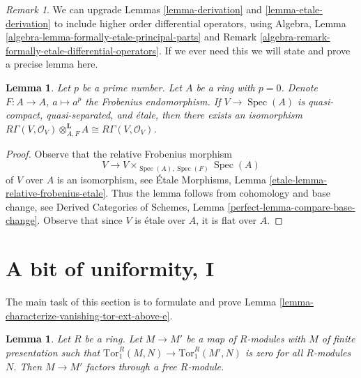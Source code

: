 \documentclass{stacks-project}
\theoremstyle{plain}
\newtheorem{lemma}[subsection]{Lemma}
\theoremstyle{definition}
\theoremstyle{remark}
\newtheorem{remark}[subsection]{Remark}
\numberwithin{equation}{subsection}
\def\Spec{\mathop{\mathrm{Spec}}}
\begin{document}
\begin{remark}
\label{remark-higher-order-operators}
We can upgrade Lemmas \ref{lemma-derivation} and \ref{lemma-etale-derivation}
to include higher order differential operators, using
Algebra, Lemma \ref{algebra-lemma-formally-etale-principal-parts} and
Remark \ref{algebra-remark-formally-etale-differential-operators}.
If we ever need this we will state and prove a
precise lemma here.
\end{remark}

\begin{lemma}
\label{lemma-etale-frobenius}
Let $p$ be a prime number. Let $A$ be a ring with $p = 0$.
Denote $F : A \to A$, $a \mapsto a^p$ the Frobenius endomorphism.
If $V \to \Spec(A)$ is quasi-compact, quasi-separated,
and \'etale, then there exists an isomorphism
$R\Gamma(V, \mathcal{O}_V) \otimes_{A, F}^\mathbf{L} A \cong
R\Gamma(V, \mathcal{O}_V)$.
\end{lemma}

\begin{proof}
Observe that the relative Frobenius morphism
$$
V \longrightarrow V \times_{\Spec(A), \Spec(F)} \Spec(A)
$$
of $V$ over $A$ is an isomorphism, see
\'Etale Morphisms, Lemma \ref{etale-lemma-relative-frobenius-etale}.
Thus the lemma follows from cohomology and base change, see
Derived Categories of Schemes, Lemma
\ref{perfect-lemma-compare-base-change}.
Observe that since $V$ is \'etale over $A$, it is flat over $A$.
\end{proof}





\section{A bit of uniformity, I}
\label{section-uniform-vanishing}

\noindent
The main task of this section is to formulate and prove
Lemma \ref{lemma-characterize-vanishing-tor-ext-above-e}.

\begin{lemma}
\label{lemma-map-tor-1-zero}
Let $R$ be a ring. Let $M \to M'$ be a map of $R$-modules with
$M$ of finite presentation
such that $\text{Tor}_1^R(M, N) \to \text{Tor}_1^R(M', N)$ is zero for all
$R$-modules $N$. Then $M \to M'$ factors through a free $R$-module.
\end{lemma}
\end{document}
